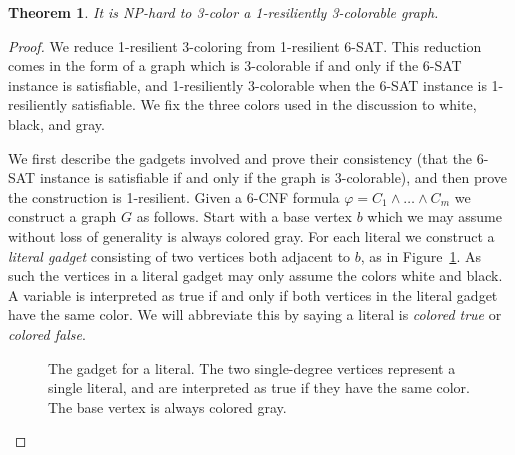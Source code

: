 \documentclass{article}[11pt]  %
\newtheorem{thm}{Theorem}
\begin{document}
\begin{thm}\label{thm:3-1}
It is NP-hard to 3-color a 1-resiliently 3-colorable graph.
\end{thm}
\begin{proof}
We reduce 1-resilient 3-coloring from 1-resilient 6-SAT. This reduction comes
in the form of a graph which is 3-colorable if and only if the 6-SAT instance is
satisfiable, and 1-resiliently 3-colorable when the 6-SAT instance is
1-resiliently satisfiable. We fix the three colors used in the discussion to
white, black, and gray.

We first describe the gadgets involved and prove their consistency (that the
6-SAT instance is satisfiable if and only if the graph is 3-colorable), and
then prove the construction is 1-resilient. Given a 6-CNF formula $\varphi = C_1
\wedge \dots \wedge C_m$ we construct a graph $G$ as follows. Start with a base
vertex $b$ which we may assume without loss of generality is always colored
gray. For each literal we construct a \emph{literal gadget} consisting of two
vertices both adjacent to $b$, as in Figure~\ref{fig:literal-gadget}. As such
the vertices in a literal gadget may only assume the colors white and black. A
variable is interpreted as true if and only if both vertices in the literal
gadget have the same color. We will abbreviate this by saying a literal is
\emph{colored true} or \emph{colored false}.

\begin{figure}[bht]
\centering
{}
\caption{The gadget for a literal. The two single-degree vertices represent a
single literal, and are interpreted as true if they have the same color. The
base vertex is always colored gray.}
\label{fig:literal-gadget}
\end{figure}


\end{proof}
\end{document}
